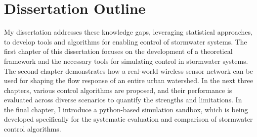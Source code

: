\section{Dissertation Outline}
My dissertation addresses these knowledge gaps, leveraging statistical approaches, to develop tools and algorithms for enabling control of stormwater systems. 
The first chapter of this dissertation focuses on the development of a theoretical framework and the necessary tools for simulating control in stormwater systems. 
The second chapter demonstrates how a real-world wireless sensor network can be used for shaping the flow response of an entire urban watershed. 
In the next three chapters, various control algorithms are proposed, and their performance is evaluated across diverse scenarios to quantify the strengths and limitations.
In the final chapter, I introduce a python-based simulation sandbox, which is being developed specifically for the systematic evaluation and comparison of stormwater control algorithms.
